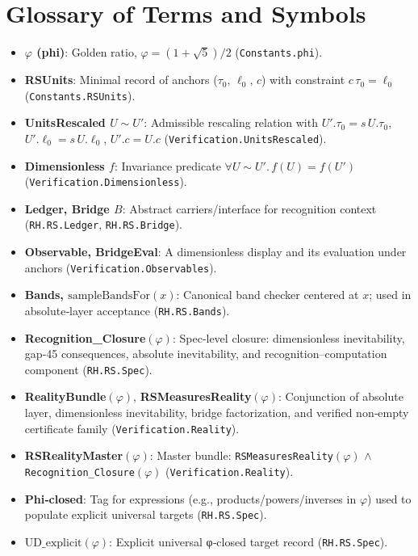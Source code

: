 \documentclass{article}
\begin{document}
\section{Glossary of Terms and Symbols}
\begin{itemize}[leftmargin=*]
  \item \textbf{$\varphi$ (phi)}: Golden ratio, \(\varphi=(1+\sqrt{5})/2\) (\texttt{Constants.phi}).
  \item \textbf{RSUnits}: Minimal record of anchors (\(\tau_0,\,\ell_0,\,c\)) with constraint \(c\,\tau_0=\ell_0\) (\texttt{Constants.RSUnits}).
  \item \textbf{UnitsRescaled $U\sim U'$}: Admissible rescaling relation with \(U'.\tau_0=s\,U.\tau_0\), \(U'.\ell_0=s\,U.\ell_0\), \(U'.c=U.c\) (\texttt{Verification.UnitsRescaled}).
  \item \textbf{Dimensionless $f$}: Invariance predicate \(\forall U\sim U'.\, f(U)=f(U')\) (\texttt{Verification.Dimensionless}).
  \item \textbf{Ledger, Bridge $B$}: Abstract carriers/interface for recognition context (\texttt{RH.RS.Ledger}, \texttt{RH.RS.Bridge}).
  \item \textbf{Observable, BridgeEval}: A dimensionless display and its evaluation under anchors (\texttt{Verification.Observables}).
  \item \textbf{Bands, $\mathrm{sampleBandsFor}(x)$}: Canonical band checker centered at \(x\); used in absolute‑layer acceptance (\texttt{RH.RS.Bands}).
  \item \textbf{Recognition\_Closure$(\varphi)$}: Spec‑level closure: dimensionless inevitability, gap‑45 consequences, absolute inevitability, and recognition–computation component (\texttt{RH.RS.Spec}).
  \item \textbf{RealityBundle$(\varphi)$}, \textbf{RSMeasuresReality$(\varphi)$}: Conjunction of absolute layer, dimensionless inevitability, bridge factorization, and verified non‑empty certificate family (\texttt{Verification.Reality}).
  \item \textbf{RSRealityMaster$(\varphi)$}: Master bundle: \texttt{RSMeasuresReality$(\varphi)$} \(\land\) \texttt{Recognition\_Closure$(\varphi)$} (\texttt{Verification.Reality}).
  \item \textbf{Phi‑closed}: Tag for expressions (e.g., products/powers/inverses in \(\varphi\)) used to populate explicit universal targets (\texttt{RH.RS.Spec}).
  \item \textbf{$\mathrm{UD\_explicit}(\varphi)$}: Explicit universal φ‑closed target record (\texttt{RH.RS.Spec}).

\end{itemize}
\end{document}
